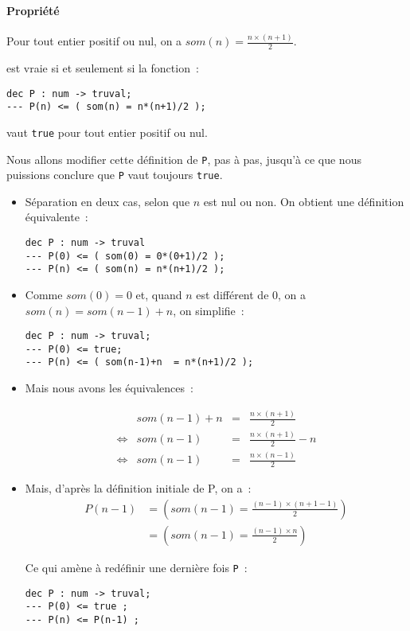 \paragraph*{Propriété}	Pour tout entier positif ou nul, on a  $som(n)= \frac{n\times(n+1)}{2}$.

est vraie si et seulement si la fonction~:

\begin{verbatim}
dec P : num -> truval;
--- P(n) <= ( som(n) = n*(n+1)/2 );
\end{verbatim}
vaut \texttt{true} pour tout entier positif ou nul.

Nous allons modifier cette définition de \texttt{P}, pas à pas, jusqu'à ce que
nous puissions conclure que \texttt{P} vaut toujours \texttt{true}.

\begin{itemize}
\item Séparation en deux cas, selon que $n$ est nul ou non. On obtient une
définition équivalente~:

\begin{verbatim}
dec P : num -> truval
--- P(0) <= ( som(0) = 0*(0+1)/2 );
--- P(n) <= ( som(n) = n*(n+1)/2 );
\end{verbatim}

\item Comme $som(0)=0$ et, quand $n$ est différent de $0$, on a 
$som(n)=som(n-1)+n$, on simplifie~:
\begin{verbatim}
dec P : num -> truval;
--- P(0) <= true;
--- P(n) <= ( som(n-1)+n  = n*(n+1)/2 );
\end{verbatim}
\item Mais nous avons les équivalences~:
	
$$\begin{array}{llcl}
	& som(n-1) + n	&=&   \frac{n \times (n+1)}{2}    \\
\Leftrightarrow &   	som(n-1) 	&=&   \frac{n\times(n+1)}{2} - n    \\
\Leftrightarrow &	som(n-1) 	&=&   \frac{n\times(n -1)}{2}
\end{array}$$
\item  Mais, d'après la définition initiale de P, on a~:
$$\begin{array}{rl}
	P(n-1)  	&= (  som(n-1) = \frac{(n-1)\times(n+1-1)}{2})  \\
		&= (  som(n-1) = \frac{(n-1)\times n}{2} )
\end{array}$$

Ce qui amène à redéfinir une dernière fois \texttt{P}~:

\begin{verbatim}
dec P : num -> truval;
--- P(0) <= true ;
--- P(n) <= P(n-1) ;
\end{verbatim}
\end{itemize}

